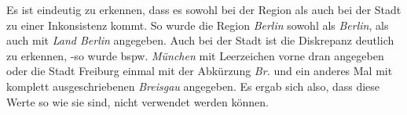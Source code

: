 Es ist eindeutig zu erkennen, dass es sowohl bei der Region als auch bei der Stadt zu einer Inkonsistenz kommt. So wurde die Region \emph{Berlin} sowohl als \emph{Berlin}, als auch mit \emph{Land Berlin} angegeben. Auch bei der Stadt ist die Diskrepanz deutlich zu erkennen, -so wurde bspw. \emph{München} mit Leerzeichen vorne dran angegeben oder die Stadt Freiburg einmal mit der Abkürzung \emph{Br.} und ein anderes Mal mit komplett ausgeschriebenen \emph{Breisgau} angegeben. Es ergab sich also, dass diese Werte so wie sie sind, nicht verwendet werden können.


